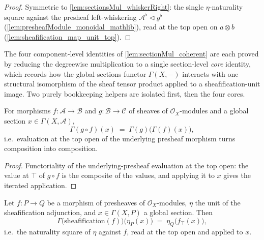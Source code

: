 \begin{proof}
  Symmetric to \cref{lem:sectionsMul_whiskerRight}: the single \(\eta\)-naturality
  square against the presheaf left-whiskering \(\mathcal{A}^{\flat} \lhd
  g^{\flat}\) (\cref{lem:presheafModule_monoidal_mathlib}), read at the top open on
  \(a \otimes b\) (\cref{lem:sheafification_map_unit_top}).
\end{proof}

The four component-level identities of \cref{lem:sectionMul_coherent} are each
proved by reducing the degreewise multiplication to a single section-level
\emph{core} identity, which records how the global-sections functor
\(\Gamma(X,-)\) interacts with one structural isomorphism of the sheaf tensor
product applied to a sheafification-unit image. Two purely bookkeeping helpers
are isolated first, then the four cores.

\begin{lemma}
  \label{lem:val_app_top_comp}
  For morphisms \(f : \mathcal{A} \to \mathcal{B}\) and
  \(g : \mathcal{B} \to \mathcal{C}\) of sheaves of \(\mathcal{O}_X\)-modules and a
  global section \(x \in \Gamma(X, \mathcal{A})\),
  \[
    \Gamma(g \circ f)(x) \;=\; \Gamma(g)\bigl(\Gamma(f)(x)\bigr),
  \]
  i.e.\ evaluation at the top open of the underlying presheaf morphism turns
  composition into composition.
\end{lemma}

\begin{proof}


  Functoriality of the underlying-presheaf evaluation at the top open: the
  value at \(\top\) of \(g \circ f\) is the composite of the values, and applying
  it to \(x\) gives the iterated application.
\end{proof}

\begin{lemma}
  \label{lem:sheafification_map_unit_top}
  Let \(f : P \to Q\) be a morphism of presheaves of \(\mathcal{O}_X\)-modules,
  \(\eta\) the unit of the sheafification adjunction, and \(x \in \Gamma(X, P)\) a
  global section. Then
  \[
    \Gamma\bigl(\mathrm{sheafification}(f)\bigr)\bigl(\eta_P(x)\bigr)
      \;=\; \eta_Q\bigl(f_{\top}(x)\bigr),
  \]
  i.e.\ the naturality square of \(\eta\) against \(f\), read at the top open and
  applied to \(x\).
\end{lemma}

